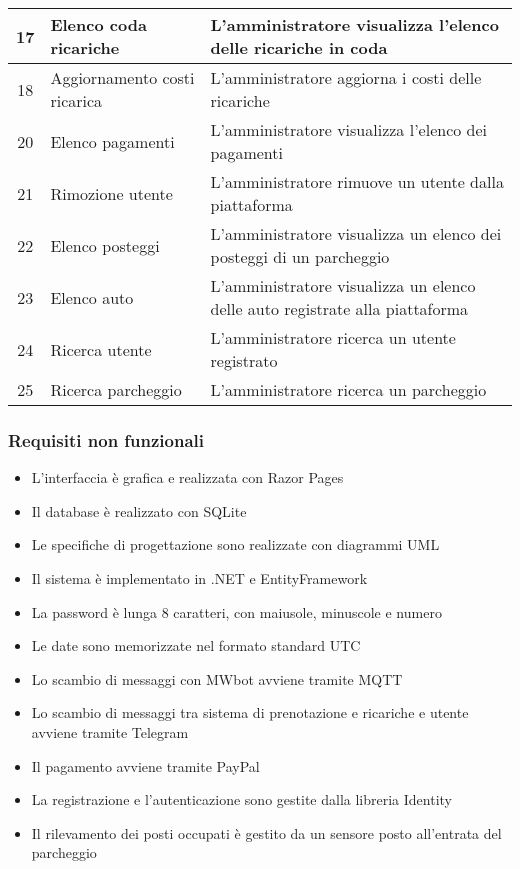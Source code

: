 \documentclass{article}
\begin{document}
\begin{table}[H]
\begin{tabular}{|c|p{3cm}|p{7cm}|}
         \hline
         17 & Elenco coda ricariche & L'amministratore visualizza l'elenco delle ricariche in coda \\
         \hline
         18 & Aggiornamento costi ricarica & L'amministratore aggiorna i costi delle ricariche \\
         \hline
         20 & Elenco pagamenti & L'amministratore visualizza l'elenco dei pagamenti \\
         \hline
         21 & Rimozione utente & L'amministratore rimuove un utente dalla piattaforma \\
         \hline
         22 & Elenco posteggi & L'amministratore visualizza un elenco dei posteggi di un parcheggio \\
         \hline
         23 & Elenco auto & L'amministratore visualizza un elenco delle auto registrate alla piattaforma \\
         \hline
         24 & Ricerca utente & L'amministratore ricerca un utente registrato \\
         \hline
         25 & Ricerca parcheggio & L'amministratore ricerca un parcheggio \\
         \hline
    \end{tabular}
\end{table}
\subsubsection{Requisiti non funzionali}
\begin{itemize}
    \item L'interfaccia è grafica e realizzata con Razor Pages
    \item Il database è realizzato con SQLite
    \item Le specifiche di progettazione sono realizzate con diagrammi UML
    \item Il sistema è implementato in .NET e EntityFramework
    \item La password è lunga 8 caratteri, con maiusole, minuscole e numero
    \item Le date sono memorizzate nel formato standard UTC
    \item Lo scambio di messaggi con MWbot avviene tramite MQTT
    \item Lo scambio di messaggi tra sistema di prenotazione e ricariche e utente avviene tramite Telegram
    \item Il pagamento avviene tramite PayPal
    \item La registrazione e l'autenticazione sono gestite dalla libreria Identity
    \item Il rilevamento dei posti occupati è gestito da un sensore posto all'entrata del parcheggio
\end{itemize}
\end{document}
